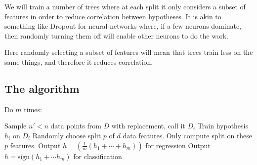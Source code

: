 \documentclass{article}
\begin{document}
  We will train a number of trees where at each split it only considers a subset of features in order to reduce correlation between hypotheses. It is akin to something like Dropout for neural networks where, if a few neurons dominate, then randomly turning them off will enable other neurons to do the work.

  Here randomly selecting a subset of features will mean that trees train less on the same things, and therefore it reduces correlation.

  \subsection{The algorithm}
    Do $m$ times:
    \begin{outline}
      \1 Sample $n' < n$ data points from $D$ with replacement, call it $D_i$
      \1 Train hypothesis $h_i$ on $D_i$
        \2 Randomly choose split $p$ of $d$ data features.
        \2 Only compute split on these $p$ features.
      \1 Output $h = (\frac{1}{m}(h_1 + \cdots + h_m))$ for regression
      \1 Output $h = \text{sign}(h_1 + \cdots h_m)$ for classification
    \end{outline}
\end{document}
